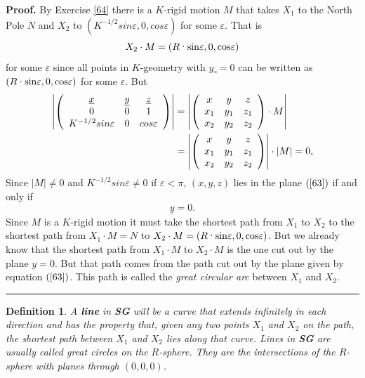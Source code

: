 \documentclass{article}%
\newtheorem{definition}[theorem]{Definition}
\newenvironment{proof}[1][Proof]{\noindent\textbf{#1.} }{\ \rule{0.5em}{0.5em}}
\begin{document}
\begin{proof}
By Exercise \ref{64} there is a $K$-rigid motion $M$ that takes $X_{1}$ to the
North Pole $N$ and $X_{2}$ to $\left(  K^{-1/2}sin\varepsilon,0,cos\varepsilon
\right)  $ for some $\varepsilon$. That is%
\[
X_{2}\cdot M=\left(  R\text{\textperiodcentered}\mathrm{sin}\varepsilon
,0,\mathrm{cos}\varepsilon\right)
\]
for some $\varepsilon$ since all points in $K$-geometry with \underline{$y$%
}$=0$ can be written as $\left(  R\text{\textperiodcentered}\mathrm{sin}%
\varepsilon,0,\mathrm{cos}\varepsilon\right)  $ for some $\varepsilon$. But%
\begin{align*}
\left\vert \left(
\begin{array}
[c]{ccc}%
\underline{x} & \underline{y} & \underline{z}\\
0 & 0 & 1\\
K^{-1/2}sin\varepsilon & 0 & cos\varepsilon
\end{array}
\right)  \right\vert  &  =\left\vert \left(
\begin{array}
[c]{ccc}%
x & y & z\\
x_{1} & y_{1} & z_{1}\\
x_{2} & y_{2} & z_{2}%
\end{array}
\right)  \cdot M\right\vert \\
&  =\left\vert \left(
\begin{array}
[c]{ccc}%
x & y & z\\
x_{1} & y_{1} & z_{1}\\
x_{2} & y_{2} & z_{2}%
\end{array}
\right)  \right\vert \cdot\left\vert M\right\vert =0,
\end{align*}
Since $\left\vert M\right\vert \neq0$ and $K^{-1/2}sin\varepsilon\neq0$ if
$\varepsilon<\pi$, $\left(  x,y,z\right)  $ lies in the plane $\left(
\ref{63}\right)  $ if and only if
\[
\underline{y}=0.
\]
Since $M$ is a $K$-rigid motion it must take the shortest path from $X_{1}$ to
$X_{2}$ to the shortest path from $X_{1}\cdot M=N$ to $X_{2}\cdot M=\left(
R\text{\textperiodcentered}\mathrm{sin}\varepsilon,0,\mathrm{cos}%
\varepsilon\right)  $. But we already know that the shortest path from
$X_{1}\cdot M$ to $X_{2}\cdot M$ is the one cut out by the plane $y=0$. But
that path comes from the path cut out by the plane given by equation $\left(
\ref{63}\right)  $. This path is called the \textit{great circular arc}
between $X_{1}$ and $X_{2}$.
\end{proof}

\begin{definition}
A \textbf{line} in \textbf{SG} will be a curve that extends infinitely in each
direction and has the property that, given any two points $X_{1}$ and $X_{2}$
on the path, the shortest path between $X_{1}$ and $X_{2}$ lies along that
curve. Lines in \textbf{SG} are usually called great circles on the
$R$-sphere. They are the intersections of the $R$-sphere with planes through
$\left(  0,0,0\right)  $.
\end{definition}
\end{document}
